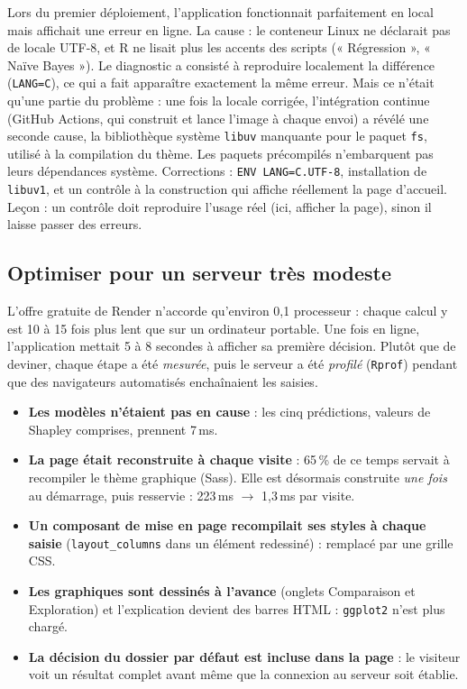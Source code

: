 \documentclass[11pt,a4paper]{article}
\newcommand{\code}[1]{\texttt{#1}}
\begin{document}
\begin{alerte}
Lors du premier déploiement, l'application fonctionnait parfaitement en local mais affichait une erreur en ligne. La cause : le conteneur Linux ne déclarait pas de locale UTF-8, et R ne lisait plus les accents des scripts (« Régression », « Naïve Bayes »). Le diagnostic a consisté à reproduire localement la différence (\code{LANG=C}), ce qui a fait apparaître exactement la même erreur. Mais ce n'était qu'une partie du problème : une fois la locale corrigée, l'intégration continue (GitHub Actions, qui construit et lance l'image à chaque envoi) a révélé une seconde cause, la bibliothèque système \code{libuv} manquante pour le paquet \code{fs}, utilisé à la compilation du thème. Les paquets précompilés n'embarquent pas leurs dépendances système. Corrections : \code{ENV LANG=C.UTF-8}, installation de \code{libuv1}, et un contrôle à la construction qui affiche réellement la page d'accueil. Leçon : un contrôle doit reproduire l'usage réel (ici, afficher la page), sinon il laisse passer des erreurs.
\end{alerte}

\subsection{Optimiser pour un serveur très modeste}
L'offre gratuite de Render n'accorde qu'environ 0,1 processeur : chaque calcul y est 10 à 15 fois plus lent que sur un ordinateur portable. Une fois en ligne, l'application mettait 5 à 8 secondes à afficher sa première décision. Plutôt que de deviner, chaque étape a été \emph{mesurée}, puis le serveur a été \emph{profilé} (\code{Rprof}) pendant que des navigateurs automatisés enchaînaient les saisies.

\begin{itemize}
\item \textbf{Les modèles n'étaient pas en cause} : les cinq prédictions, valeurs de Shapley comprises, prennent 7\,ms.
\item \textbf{La page était reconstruite à chaque visite} : 65\,\% de ce temps servait à recompiler le thème graphique (Sass). Elle est désormais construite \emph{une fois} au démarrage, puis resservie : 223\,ms $\to$ 1,3\,ms par visite.
\item \textbf{Un composant de mise en page recompilait ses styles à chaque saisie} (\code{layout\_columns} dans un élément redessiné) : remplacé par une grille CSS.
\item \textbf{Les graphiques sont dessinés à l'avance} (onglets Comparaison et Exploration) et l'explication devient des barres HTML : \code{ggplot2} n'est plus chargé.
\item \textbf{La décision du dossier par défaut est incluse dans la page} : le visiteur voit un résultat complet avant même que la connexion au serveur soit établie.
\end{itemize}
\end{document}

